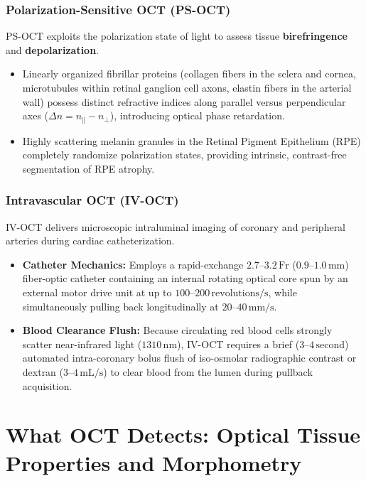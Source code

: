 \documentclass[11pt,a4paper]{article}
\begin{document}
\subsubsection{Polarization-Sensitive OCT (PS-OCT)}
PS-OCT exploits the polarization state of light to assess tissue \textbf{birefringence} and \textbf{depolarization}.
\begin{itemize}[leftmargin=*]
    \item Linearly organized fibrillar proteins (collagen fibers in the sclera and cornea, microtubules within retinal ganglion cell axons, elastin fibers in the arterial wall) possess distinct refractive indices along parallel versus perpendicular axes ($\Delta n = n_\parallel - n_\perp$), introducing optical phase retardation.
    \item Highly scattering melanin granules in the Retinal Pigment Epithelium (RPE) completely randomize polarization states, providing intrinsic, contrast-free segmentation of RPE atrophy.
\end{itemize}

\subsubsection{Intravascular OCT (IV-OCT)}
IV-OCT delivers microscopic intraluminal imaging of coronary and peripheral arteries during cardiac catheterization.
\begin{itemize}[leftmargin=*]
    \item \textbf{Catheter Mechanics:} Employs a rapid-exchange $2.7\text{--}3.2\,\text{Fr}$ ($0.9\text{--}1.0\,\text{mm}$) fiber-optic catheter containing an internal rotating optical core spun by an external motor drive unit at up to $100\text{--}200\,\text{revolutions/s}$, while simultaneously pulling back longitudinally at $20\text{--}40\,\text{mm/s}$.
    \item \textbf{Blood Clearance Flush:} Because circulating red blood cells strongly scatter near-infrared light ($1310\,\text{nm}$), IV-OCT requires a brief ($3\text{--}4\,\text{second}$) automated intra-coronary bolus flush of iso-osmolar radiographic contrast or dextran ($3\text{--}4\,\text{mL/s}$) to clear blood from the lumen during pullback acquisition.
\end{itemize}

\section{What OCT Detects: Optical Tissue Properties and Morphometry}
\end{document}
